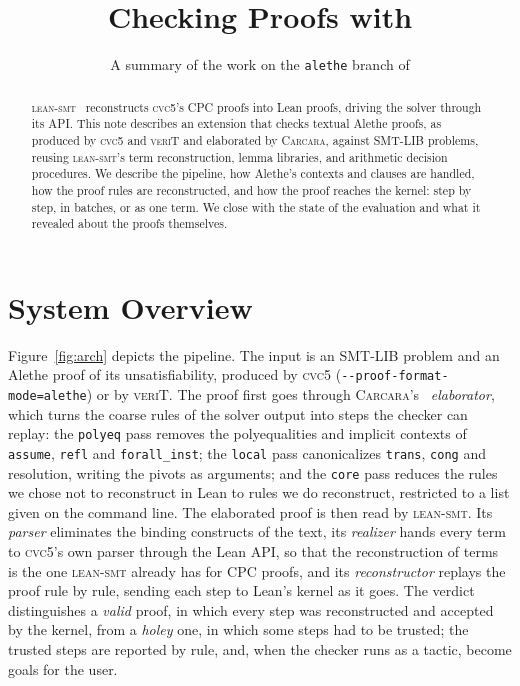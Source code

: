 \documentclass[runningheads]{llncs}
\title{Checking \alethe Proofs with \tactic}
\author{A summary of the work on the \texttt{alethe} branch of \tactic}
\institute{Universidade Federal de Minas Gerais, Belo Horizonte, Brazil}
\newcommand{\cvcv}{\textsc{cvc5}\xspace}
\newcommand{\tactic}{\textsc{lean-smt}\xspace}
\newcommand{\carcara}{\textsc{Carcara}\xspace}
\newcommand{\verit}{\textsc{veriT}\xspace}
\newcommand{\alethe}{Alethe\xspace}
\newcommand{\cpc}{CPC\xspace}
\newcommand{\rulename}[1]{\texttt{#1}}
\begin{document}
\maketitle

\begin{abstract}
  \tactic~\cite{Mohamed2025} reconstructs \cvcv's \cpc proofs into Lean proofs,
  driving the solver through its API. This note describes an extension that checks textual
  \alethe proofs, as produced by \cvcv and \verit and elaborated by \carcara,
  against SMT-LIB problems, reusing \tactic's term reconstruction, lemma
  libraries, and arithmetic decision procedures. We describe the pipeline, how
  \alethe's contexts and clauses are handled, how the proof rules are
  reconstructed, and how the proof reaches the kernel: step by step, in
  batches, or as one term. We close with the state of the evaluation and what
  it revealed about the proofs themselves.
\end{abstract}

\section{System Overview}
\label{sec:overview}

Figure~\ref{fig:arch} depicts the pipeline. The input is an SMT-LIB problem
and an \alethe proof of its unsatisfiability, produced by \cvcv
(\texttt{-{}-proof-format-mode=alethe}) or by \verit. The proof first goes
through \carcara's~\cite{Andreotti2023} \emph{elaborator}, which turns the coarse rules of the
solver output into steps the checker can replay: the \texttt{polyeq} pass
removes the polyequalities and implicit contexts of \rulename{assume},
\rulename{refl} and \rulename{forall\_inst}; the \texttt{local} pass
canonicalizes \rulename{trans}, \rulename{cong} and resolution, writing the
pivots as arguments; and the \texttt{core} pass reduces the rules we chose
not to reconstruct in Lean to rules we do reconstruct, restricted to a list
given on the command line. The elaborated proof is then read by \tactic. Its
\emph{parser} eliminates the binding constructs of the text, its
\emph{realizer} hands every term to \cvcv's own parser through the Lean API,
so that the reconstruction of terms is the one \tactic already has for \cpc
proofs, and its \emph{reconstructor} replays the proof rule by rule, sending
each step to Lean's kernel as it goes. The verdict distinguishes a
\emph{valid} proof, in which every step was reconstructed and accepted by the
kernel, from a \emph{holey} one, in which some steps had to be trusted; the
trusted steps are reported by rule, and, when the checker runs as a tactic,
become goals for the user.
\end{document}
